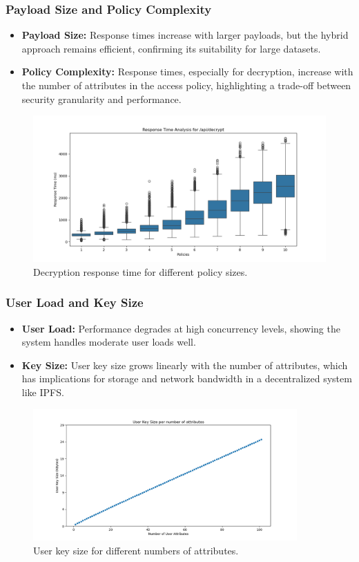 \documentclass{beamer}
\begin{document}
\begin{frame}
    \frametitle{Payload Size and Policy Complexity}
    \begin{itemize}
        \item \textbf{Payload Size:} Response times increase with larger payloads, but the hybrid approach remains efficient, confirming its suitability for large datasets.
        \item \textbf{Policy Complexity:} Response times, especially for decryption, increase with the number of attributes in the access policy, highlighting a trade-off between security granularity and performance.
    \end{itemize}
        \begin{figure}
        \includegraphics[width=\textwidth]{images/phase4/response_time_api_decrypt.png}
        \caption{Decryption response time for different policy sizes.}
    \end{figure}
\end{frame}

\begin{frame}
    \frametitle{User Load and Key Size}
    \begin{itemize}
        \item \textbf{User Load:} Performance degrades at high concurrency levels, showing the system handles moderate user loads well.
        \item \textbf{Key Size:} User key size grows linearly with the number of attributes, which has implications for storage and network bandwidth in a decentralized system like IPFS.
    \end{itemize}
    \begin{figure}
        \includegraphics[width=0.9\textwidth]{images/key_size_analysis/user_key_size_analysis.png}
        \caption{User key size for different numbers of attributes.}
    \end{figure}
\end{frame}
\end{document}
